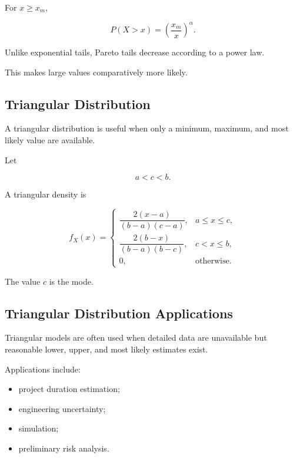 For \(x\geq x_m\),

\[
\boxed{
P(X>x)
=
\left(
\frac{x_m}{x}
\right)^\alpha.
}
\]

Unlike exponential tails, Pareto tails decrease according to a power
law.

This makes large values comparatively more likely.

\subsection{Triangular Distribution}
\label{subsec:triangular-distribution}

A triangular distribution is useful when only a minimum, maximum, and
most likely value are available.

Let

\[
a<c<b.
\]

A triangular density is

\[
\boxed{
f_X(x)
=
\begin{cases}
\dfrac{2(x-a)}{(b-a)(c-a)},
&
a\leq x\leq c,
\\[3mm]
\dfrac{2(b-x)}{(b-a)(b-c)},
&
c<x\leq b,
\\[3mm]
0,
&
\text{otherwise}.
\end{cases}
}
\]

The value \(c\) is the mode.

\subsection{Triangular Distribution Applications}
\label{subsec:triangular-applications}

Triangular models are often used when detailed data are unavailable but
reasonable lower, upper, and most likely estimates exist.

Applications include:

\begin{itemize}
    \item project duration estimation;
    \item engineering uncertainty;
    \item simulation;
    \item preliminary risk analysis.
\end{itemize}

